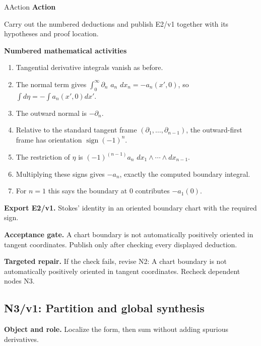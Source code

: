 \documentclass[preprint,12pt,aps,pra,showkeys,amsmath,amssymb,superscriptaddress,floatfix]{revtex4-2}
\theoremstyle{definition}
\theoremstyle{remark}
\newcommand{\mmfaculty}[3]{%
 \begin{mmfacultybox}{#1}{#2}
 {\sffamily\bfseries\color{MMBlue}#2}\par\smallskip #3
 \end{mmfacultybox}}
\newcommand{\field}[2]{\par\smallskip\noindent\textbf{#1.} #2\par}
\begin{document}
\mmfaculty{A}{Action}{Carry out the numbered deductions and publish E2/v1 together with its
hypotheses and proof location.}

\smallskip\noindent\textbf{Numbered mathematical activities}

\begin{enumerate}[label=N2.\arabic*,leftmargin=3.4em]

\item Tangential derivative integrals vanish as before.

\item The normal term gives \(\int _{0}^\infty \partial _n\) \(a_n\)
\(dx_n=-a_n(x',0)\), so \(\int d\eta =-\int a_n(x',0)dx'\).

\item The outward normal is \(-\partial _n\).

\item Relative to the standard tangent frame
\((\partial _{1},\ldots ,\partial _{n-1})\), the outward-first frame has
orientation \(\operatorname{sign} (-1)^n\).

\item The restriction of \(\eta\) is \((-1)^{(n-1)}a_n\)
\(dx_{1}\wedge \cdots \wedge dx_{n-1}\).

\item Multiplying these signs gives \(-a_n\), exactly the computed boundary
integral.

\item For \(n=1\) this says the boundary at 0 contributes \(-a_{1}(0)\).

\end{enumerate}

\field{Export E2/v1}{Stokes' identity in an oriented boundary chart with the required sign.}

\field{Acceptance gate}{A chart boundary is not automatically positively oriented in tangent
coordinates. Publish only after checking every displayed deduction.}

\field{Targeted repair}{If the check fails, revise N2: A chart boundary is not automatically
positively oriented in tangent coordinates. Recheck dependent nodes N3.}

\clearpage

\subsection{N3/v1: Partition and global synthesis}

\field{Object and role}{Localize the form, then sum without adding spurious derivatives.}
\end{document}

